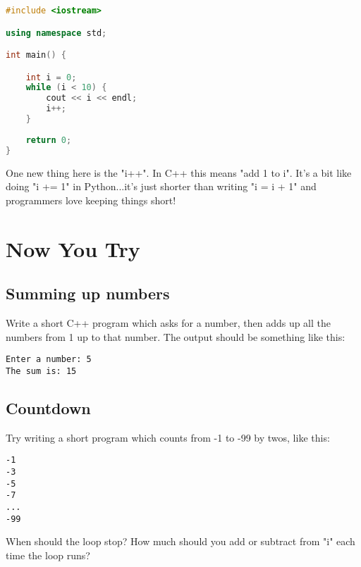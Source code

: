 \documentclass[a4paper,12pt]{article} %
\begin{document}
\vspace{5mm}
\begin{lstlisting}[language=C++]
#include <iostream>

using namespace std;

int main() {

	int i = 0;
	while (i < 10) {
		cout << i << endl;
		i++;
	}
	
	return 0;
}
\end{lstlisting}

\noindent
One new thing here is the "i++". In C++ this means "add 1 to i". It's a bit like doing "i += 1" in Python...it's just shorter than writing "i = i + 1" and programmers love keeping things short!\\

\section{Now You Try}

\subsection{Summing up numbers}

Write a short C++ program which asks for a number, then adds up all the numbers from 1 up to that number. The output should be something like this:

\begin{verbatim}
Enter a number: 5
The sum is: 15
\end{verbatim}

\subsection{Countdown}

Try writing a short program which counts from -1 to -99 by twos, like this:

\begin{verbatim}
-1
-3
-5
-7
...
-99
\end{verbatim}

\noindent
When should the loop stop? How much should you add or subtract from "i" each time the loop runs? 
\end{document}
